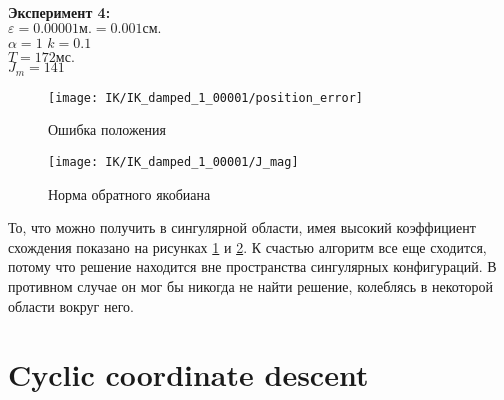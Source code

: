 \textbf{Эксперимент 4:}\\
$\varepsilon = 0.00001\text{м.} = 0.001\text{см.}$\\
$\alpha = 1$
$k = 0.1$\\
$T = 172 \text{мс.}$\\
$J_{m} = 141$

\begin{figure}[h!]
	\centering
	\texttt{[image: IK/IK\_damped\_1\_00001/position\_error]}
	\caption{Ошибка положения}
	\label{fig:4_5_7}
\end{figure}
\begin{figure}[h!]
	\centering
	\texttt{[image: IK/IK\_damped\_1\_00001/J\_mag]}
	\caption{Норма обратного якобиана}
	\label{fig:4_5_8}
\end{figure}
То, что можно получить в сингулярной области, имея высокий коэффициент схождения показано на рисунках \ref{fig:4_5_7} и \ref{fig:4_5_8}. К счастью алгоритм все еще сходится, потому что решение находится вне пространства сингулярных конфигураций. В противном случае он мог бы никогда не найти решение, колеблясь в некоторой области вокруг него.

\section{Cyclic coordinate descent} \label{sect:4_6}